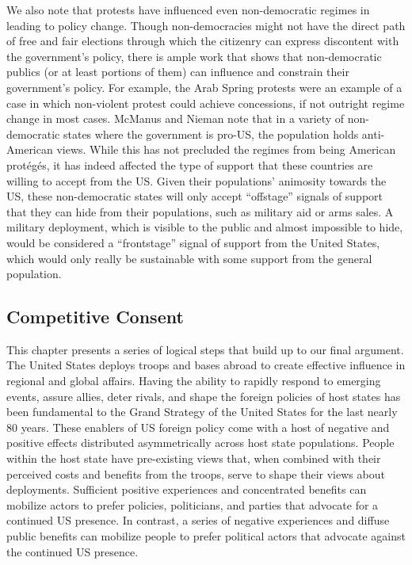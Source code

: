 We also note that protests have influenced even non-democratic regimes in leading to policy change. Though non-democracies might not have the direct path of free and fair elections through which the citizenry can express discontent with the government's policy, there is ample work that shows that non-democratic publics (or at least portions of them) can influence and constrain their government's policy. For example, the Arab Spring protests were an example of a case in which non-violent protest could achieve concessions, if not outright regime change in most cases.\autocite{Chenoweth2013} McManus and Nieman note that in a variety of non-democratic states where the government is pro-US, the population holds anti-American views.\autocite{Mcmanus2017} While this has not precluded the regimes from being American prot\'{e}g\'{e}s, it has indeed affected the type of support that these countries are willing to accept from the US. Given their populations' animosity towards the US, these non-democratic states will only accept ``offstage'' signals of support that they can hide from their populations, such as military aid or arms sales.\autocite{Mcmanus2017} A military deployment, which is visible to the public and almost impossible to hide, would be considered a ``frontstage'' signal of support from the United States, which would only really be sustainable with some support from the general population.\autocite{Mcmanus2017}   

\subsection*{Competitive Consent}


This chapter presents a series of logical steps that build up to our final argument. The United States deploys troops and bases abroad to create effective influence in regional and global affairs. Having the ability to rapidly respond to emerging events, assure allies, deter rivals, and shape the foreign policies of host states has been fundamental to the Grand Strategy of the United States for the last nearly 80 years. These enablers of US foreign policy come with a host of negative and positive effects distributed asymmetrically across host state populations. People within the host state have pre-existing views that, when combined with their perceived costs and benefits from the troops, serve to shape their views about deployments. Sufficient positive experiences and concentrated benefits can mobilize actors to prefer policies, politicians, and parties that advocate for a continued US presence. In contrast, a series of negative experiences and diffuse public benefits can mobilize people to prefer political actors that advocate against the continued US presence. 


